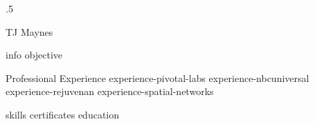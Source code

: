 \documentclass[10pt]{article}
\begin{document}
\moveleft.5\hoffset\centerline{\huge TJ Maynes}
{info}
{objective}
\begin{section}{Professional Experience}
  {experience-pivotal-labs}
  {experience-nbcuniversal}
  {experience-rejuvenan}
  {experience-spatial-networks}
\end{section}
{skills}
{certificates}
{education}
\end{document}
